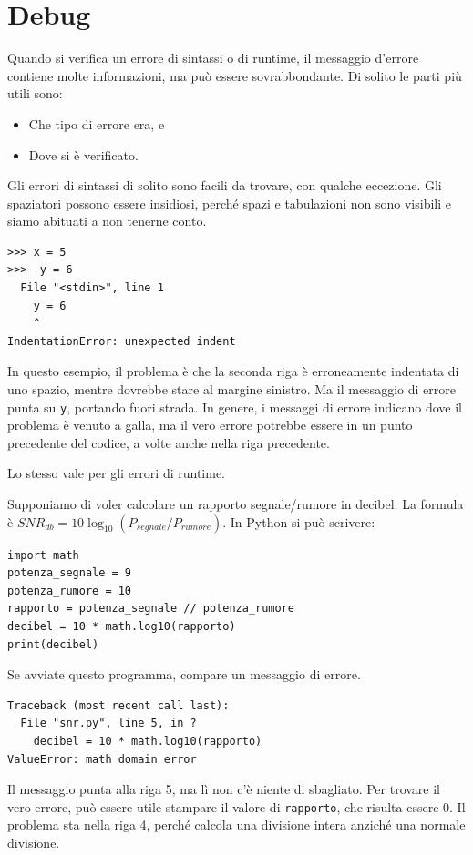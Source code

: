 \documentclass[10pt]{book}
\begin{document}
\section{Debug}
\label{whitespace}

Quando si verifica un errore di sintassi o di runtime, il messaggio d'errore  contiene molte informazioni, ma può essere sovrabbondante. Di solito le parti più utili sono:

\begin{itemize}

\item Che tipo di errore era, e

\item Dove si è verificato.

\end{itemize}

Gli errori di sintassi di solito sono facili da trovare, con qualche eccezione. Gli spaziatori possono essere insidiosi, perché spazi e tabulazioni non sono visibili e siamo abituati a non tenerne conto.

\begin{verbatim}
>>> x = 5
>>>  y = 6
  File "<stdin>", line 1
    y = 6
    ^
IndentationError: unexpected indent
\end{verbatim}
%
In questo esempio, il problema è che la seconda riga è erroneamente indentata di uno spazio, mentre dovrebbe stare al margine sinistro. Ma il messaggio di errore punta su {\tt y}, portando fuori strada. In genere, i messaggi di errore indicano dove il problema è venuto a galla, ma il vero errore potrebbe essere in un punto precedente del codice, a volte anche nella riga precedente.


Lo stesso vale per gli errori di runtime. 

Supponiamo di voler calcolare un rapporto segnale/rumore in decibel. La formula è
 $SNR_{db} = 10 \log_{10} (P_{segnale} / P_{rumore})$. In Python si può scrivere:

\begin{verbatim}
import math
potenza_segnale = 9
potenza_rumore = 10
rapporto = potenza_segnale // potenza_rumore
decibel = 10 * math.log10(rapporto)
print(decibel)
\end{verbatim}
%
Se avviate questo programma, compare un messaggio di errore.

\begin{verbatim}
Traceback (most recent call last):
  File "snr.py", line 5, in ?
    decibel = 10 * math.log10(rapporto)
ValueError: math domain error
\end{verbatim}
%
Il messaggio punta alla riga 5, ma lì non c'è niente di sbagliato. Per trovare il vero errore, può essere utile stampare il valore di {\tt rapporto}, che risulta essere 0. Il problema sta nella riga 4, perché calcola una divisione intera anziché una normale divisione.
\end{document}
